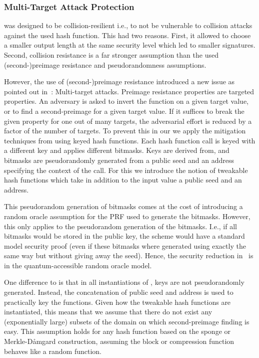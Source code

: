 \subsubsection{Multi-Target Attack Protection} 
\spc was designed to be collision-resilient i.e., to not be vulnerable to 
collision attacks against the used hash function. This had two reasons. First,
it allowed to choose a smaller output length at the same security level which 
led to smaller signatures. Second, collision resistance is a far stronger 
assumption than the used (second-)preimage resistance and pseudorandomness 
assumptions. 

However, the use of (second-)preimage resistance introduced a new issue as 
pointed out in~\cite{Huelsing2016}: Multi-target attacks. Preimage resistance
properties are targeted properties. An adversary is asked to invert the function
on a given target value, or to find a second-preimage for a given target value.
If it suffices to break the given property for one out of many targets, the 
adversarial effort is reduced by a factor of the number of targets. To prevent
this in our we apply the mitigation techniques from \cite{Huelsing2016} using keyed 
hash functions. Each hash function call is keyed with a different key and applies 
different bitmasks. Keys are derived from, and bitmasks are
pseudorandomly generated from a public seed and an address specifying the 
context of the call. For this we introduce the notion of tweakable hash functions 
which take in addition to the input value a public seed and an address.

This pseudorandom generation of bitmasks comes at the cost of introducing a 
random oracle assumption for the PRF used to generate the bitmasks. However,
this only applies to the pseudorandom generation of the bitmasks. I.e., if 
all bitmasks would be stored in the public key, the scheme would have a standard 
model security proof (even if these bitmasks where generated using exactly the 
same way but without giving away the seed). Hence, the security reduction 
in~\cite{Huelsing2016} is in the quantum-accessible random oracle model. 

One difference to \cite{Huelsing2016} is that in all instantiations of \spx, 
keys are not pseudorandomly generated. Instead, the concatenation of 
public seed and address is used to practically key the functions. 
Given how the tweakable hash functions are instantiated, this means that we 
assume that there do not exist any (exponentially large) subsets of the domain 
on which second-preimage finding is easy. This assumption holds for any hash
function based on the sponge or Merkle-D{\aa}mgard construction, assuming the 
block or compression function behaves like a random function.

